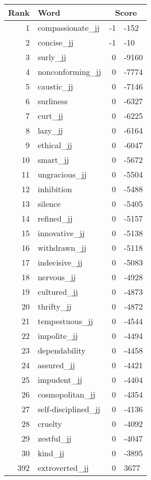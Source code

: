 \begin{longtable}[!htbp]{| rlr@{.}l |}
    \hline
    \textbf{Rank} & \textbf{Word} & \multicolumn{2}{c|}{\textbf{Score}} \\
    \hline
    \endhead
    1 & compassionate\_jj & -1 & -152 \\
    2 & concise\_jj & -1 & -10 \\
    3 & surly\_jj & 0 & -9160 \\
    4 & nonconforming\_jj & 0 & -7774 \\
    5 & caustic\_jj & 0 & -7146 \\
    6 & surliness & 0 & -6327 \\
    7 & curt\_jj & 0 & -6225 \\
    8 & lazy\_jj & 0 & -6164 \\
    9 & ethical\_jj & 0 & -6047 \\
    10 & smart\_jj & 0 & -5672 \\
    11 & ungracious\_jj & 0 & -5504 \\
    12 & inhibition & 0 & -5488 \\
    13 & silence & 0 & -5405 \\
    14 & refined\_jj & 0 & -5157 \\
    15 & innovative\_jj & 0 & -5138 \\
    16 & withdrawn\_jj & 0 & -5118 \\
    17 & indecisive\_jj & 0 & -5083 \\
    18 & nervous\_jj & 0 & -4928 \\
    19 & cultured\_jj & 0 & -4873 \\
    20 & thrifty\_jj & 0 & -4872 \\
    21 & tempestuous\_jj & 0 & -4544 \\
    22 & impolite\_jj & 0 & -4494 \\
    23 & dependability & 0 & -4458 \\
    24 & assured\_jj & 0 & -4421 \\
    25 & impudent\_jj & 0 & -4404 \\
    26 & cosmopolitan\_jj & 0 & -4354 \\
    27 & self-disciplined\_jj & 0 & -4136 \\
    28 & cruelty & 0 & -4092 \\
    29 & zestful\_jj & 0 & -4047 \\
    30 & kind\_jj & 0 & -3895 \\
    392 & extroverted\_jj & 0 & 3677 \\

\end{longtable}
